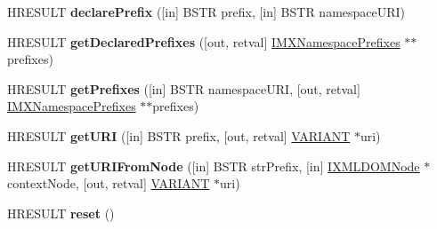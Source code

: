 \begin{DoxyCompactItemize}
\item 
\mbox{\label{interface_m_s_x_m_l2_1_1_i_v_b_m_x_namespace_manager_a3478b6af818b070a44a45be29116ee26}} 
H\+R\+E\+S\+U\+LT {\bfseries declare\+Prefix} (\mbox{[}in\mbox{]} B\+S\+TR prefix, \mbox{[}in\mbox{]} B\+S\+TR namespace\+U\+RI)
\item 
\mbox{\label{interface_m_s_x_m_l2_1_1_i_v_b_m_x_namespace_manager_aa0bc0b731146f37cdca55ce4a39535e5}} 
H\+R\+E\+S\+U\+LT {\bfseries get\+Declared\+Prefixes} (\mbox{[}out, retval\mbox{]} \hyperlink{interface_m_s_x_m_l2_1_1_i_m_x_namespace_prefixes}{I\+M\+X\+Namespace\+Prefixes} $\ast$$\ast$prefixes)
\item 
\mbox{\label{interface_m_s_x_m_l2_1_1_i_v_b_m_x_namespace_manager_a97a89bbf290999f5b88394a698fce4ae}} 
H\+R\+E\+S\+U\+LT {\bfseries get\+Prefixes} (\mbox{[}in\mbox{]} B\+S\+TR namespace\+U\+RI, \mbox{[}out, retval\mbox{]} \hyperlink{interface_m_s_x_m_l2_1_1_i_m_x_namespace_prefixes}{I\+M\+X\+Namespace\+Prefixes} $\ast$$\ast$prefixes)
\item 
\mbox{\label{interface_m_s_x_m_l2_1_1_i_v_b_m_x_namespace_manager_a0861f5f2b6672b502903b0d626df2d10}} 
H\+R\+E\+S\+U\+LT {\bfseries get\+U\+RI} (\mbox{[}in\mbox{]} B\+S\+TR prefix, \mbox{[}out, retval\mbox{]} \hyperlink{structtag_v_a_r_i_a_n_t}{V\+A\+R\+I\+A\+NT} $\ast$uri)
\item 
\mbox{\label{interface_m_s_x_m_l2_1_1_i_v_b_m_x_namespace_manager_a2a8dc2a6f2bf26ea72b66f500538a403}} 
H\+R\+E\+S\+U\+LT {\bfseries get\+U\+R\+I\+From\+Node} (\mbox{[}in\mbox{]} B\+S\+TR str\+Prefix, \mbox{[}in\mbox{]} \hyperlink{interface_m_s_x_m_l2_1_1_i_x_m_l_d_o_m_node}{I\+X\+M\+L\+D\+O\+M\+Node} $\ast$context\+Node, \mbox{[}out, retval\mbox{]} \hyperlink{structtag_v_a_r_i_a_n_t}{V\+A\+R\+I\+A\+NT} $\ast$uri)
\item 
\mbox{\label{interface_m_s_x_m_l2_1_1_i_v_b_m_x_namespace_manager_ab5f2c32051fd28c01e1dd0f8f3be944e}} 
H\+R\+E\+S\+U\+LT {\bfseries reset} ()
\item 

\end{DoxyCompactItemize}
